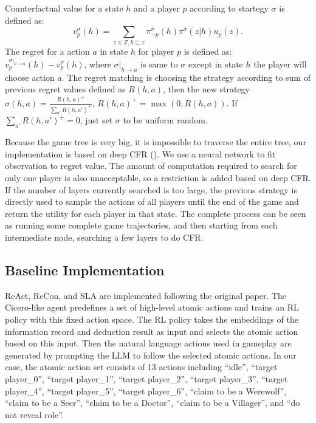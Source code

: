 Counterfactual value for a state $h$ and a player $p$ according to startegy $\sigma$ is defined as:
\begin{equation}
    v_{p}^{\sigma}(h) = \sum_{z\in Z, h \sqsubset z} \pi^\sigma_{-p}(h)\pi^\sigma(z|h)u_p(z).
\end{equation}
The regret for a action $a$ in state $h$ for player $p$ is defined as: $v_p^{\sigma|_{h\to a}}(h) - v_{p}^{\sigma}(h)$, where $\sigma|_{h\to a}$ is same to $\sigma$ except in state $h$ the player will choose action $a$. The regret matching is choosing the strategy according to sum of previous regret values defined as $R(h,a)$, then the new strategy $\sigma(h,a) = \frac{R(h,a)^+}{\sum_{a'} R(h,a')^+}$, $R(h,a)^+ = \max(0,R(h,a))$. If $\sum_{a'} R(h,a')^+ =0$, just set $\sigma$ to be uniform random.

Because the game tree is very big, it is impossible to traverse the entire tree,  our implementation is based on deep CFR (\cite{brown2019deep}). We use a neural network to fit observation to regret value. The amount of computation required to search for only one player is also unacceptable, so a restriction is added based on deep CFR. If the number of layers currently searched is too large, the previous strategy is directly used to sample the actions of all players until the end of the game and return the utility for each player in that state. The complete process can be seen as running some complete game trajectories, and then starting from each intermediate node, searching a few layers to do CFR.

\subsection{Baseline Implementation}
ReAct, ReCon, and SLA are implemented following the original paper. The Cicero-like agent predefines a set of high-level atomic actions and trains an RL policy with this fixed action space. 
The RL policy takes the embeddings of the information record and deduction result as input and selects the atomic action based on this input.
Then the natural language actions used in gameplay are generated by prompting the LLM to follow the selected atomic actions.
In our case, the atomic action set consists of 13 actions including ``idle'', ``target player\_0'', ``target player\_1'', ``target player\_2'', ``target player\_3'', ``target player\_4'', ``target player\_5'', ``target player\_6'', ``claim to be a Werewolf'', ``claim to be a Seer'', ``claim to be a Doctor'', ``claim to be a Villager'', and ``do not reveal role''. 
